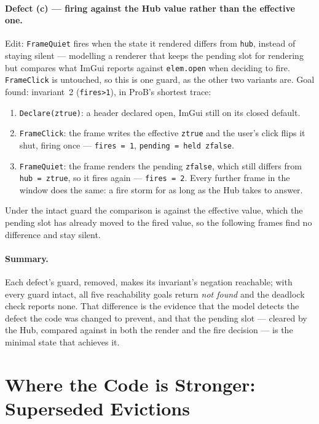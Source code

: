 \documentclass[a4paper,10pt,fleqn]{article}
\begin{document}
\paragraph{Defect (c) --- firing against the Hub value rather than the
effective one.}
Edit: \texttt{FrameQuiet} fires when the state it rendered differs from
\texttt{hub}, instead of staying silent --- modelling a renderer that keeps the
pending slot for rendering but compares what ImGui reports against
\texttt{elem.open} when deciding to fire.  \texttt{FrameClick} is untouched, so
this is one guard, as the other two variants are.  Goal found: invariant~2
(\texttt{fires>1}), in ProB's shortest trace:
\begin{enumerate}
  \item \texttt{Declare(ztrue)}: a header declared open, ImGui still on its
    closed default.
  \item \texttt{FrameClick}: the frame writes the effective \texttt{ztrue} and
    the user's click flips it shut, firing once --- \texttt{fires = 1},
    \texttt{pending = held~zfalse}.
  \item \texttt{FrameQuiet}: the frame renders the pending \texttt{zfalse},
    which still differs from \texttt{hub = ztrue}, so it fires again ---
    \texttt{fires = 2}.  Every further frame in the window does the same: a
    fire storm for as long as the Hub takes to answer.
\end{enumerate}
Under the intact guard the comparison is against the effective value, which the
pending slot has already moved to the fired value, so the following frames find
no difference and stay silent.

\paragraph{Summary.}
Each defect's guard, removed, makes its invariant's negation reachable; with
every guard intact, all five reachability goals return \emph{not found} and the
deadlock check reports none.  That difference is the evidence that the model
detects the defect the code was changed to prevent, and that the pending slot
--- cleared by the Hub, compared against in both the render and the fire
decision --- is the minimal state that achieves it.

\section{Where the Code is Stronger: Superseded Evictions}
\label{sec:evict}
\end{document}
